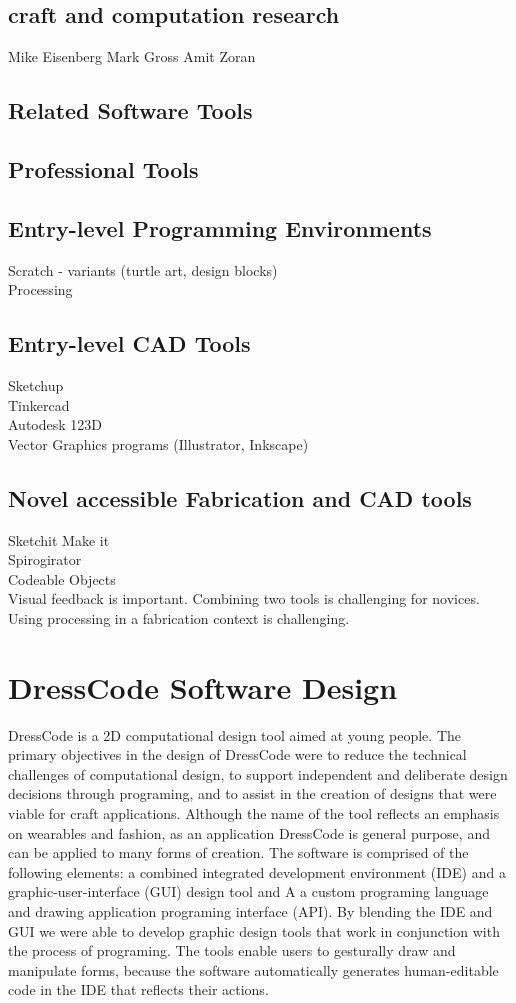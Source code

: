 \documentclass{sigchi}
\begin{document}
\subsection{craft and computation research}
Mike Eisenberg
Mark Gross
Amit Zoran

\subsection{Related Software Tools}
\subsection{Professional Tools}
\subsection{Entry-level Programming Environments}
Scratch - variants (turtle art, design blocks) \\
Processing \\
\subsection{Entry-level CAD Tools}
Sketchup\\
Tinkercad\\
Autodesk 123D\\
Vector Graphics programs (Illustrator, Inkscape)\\
\subsection{Novel accessible Fabrication and CAD tools}
Sketchit Make it\\
Spirogirator\\
Codeable Objects\\

Visual feedback is important. Combining two tools is challenging for novices. Using processing in a fabrication context is challenging.

\section{DressCode Software Design}
DressCode is a 2D computational design tool aimed at young people. The primary objectives in the design of DressCode were to reduce the technical challenges of computational design, to support independent and deliberate design decisions through programing, and to assist in the creation of designs that were viable for craft applications. Although the name of the tool reflects an emphasis on wearables and fashion, as an application DressCode is general purpose, and can be applied to many forms of creation. The software is comprised of the following elements: a combined integrated development environment (IDE) and a graphic-user-interface (GUI) design tool and  A a custom programing language and drawing application programing interface (API). By blending the IDE and GUI we were able to develop graphic design tools that work in conjunction with the process of programing. The tools enable users to gesturally draw and manipulate forms, because the software automatically generates human-editable code in the IDE that reflects their actions.
\end{document}
